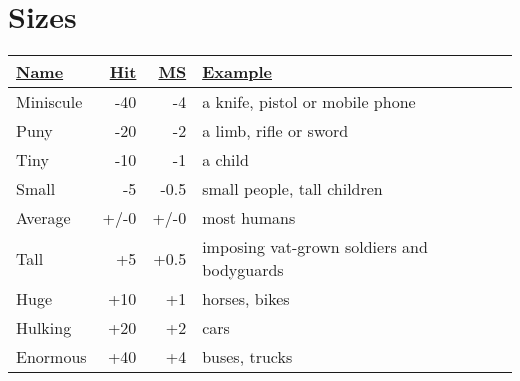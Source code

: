 \section{Sizes}
\label{sizestable}
\begin{tabularx}{\columnwidth}{|l|r|r|X|}
	\hline
	\ul{Name} & \ul{Hit} & \ul{MS} & \ul{Example} \\ \hline
	Miniscule & -40 & -4 & a knife, pistol or mobile phone \\ \hline
	Puny & -20 & -2 & a limb, rifle or sword \\ \hline
	Tiny & -10 & -1 & a child \\ \hline
	Small & -5 & -0.5 & small people, tall children \\ \hline
	Average & +/-0 & +/-0 & most humans \\ \hline
	Tall & +5 & +0.5 & imposing vat-grown soldiers and bodyguards \\ \hline
	Huge & +10 & +1 & horses, bikes \\ \hline
	Hulking & +20 & +2 & cars \\ \hline
	Enormous & +40 & +4 & buses, trucks \\ \hline
\end{tabularx}

